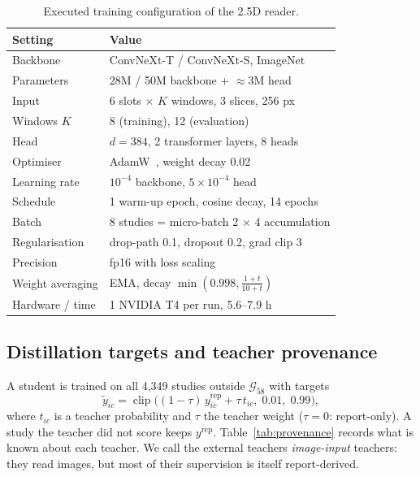 \documentclass{ieeeaccess}
\newcommand{\gold}{$\mathcal{G}_{58}$}
\begin{document}
\begin{table}[!t]
\centering
\caption{Executed training configuration of the 2.5D reader.}
\label{tab:hparams}
\setlength{\tabcolsep}{4pt}
\begin{tabular}{ll}
\toprule
Setting & Value\\
\midrule
Backbone & ConvNeXt-T / ConvNeXt-S, ImageNet\\
Parameters & 28M / 50M backbone + $\approx$3M head\\
Input & 6 slots $\times$ $K$ windows, 3 slices, 256 px\\
Windows $K$ & 8 (training), 12 (evaluation)\\
Head & $d=384$, 2 transformer layers, 8 heads\\
Optimiser & AdamW~\cite{loshchilov2019adamw}, weight decay 0.02\\
Learning rate & $10^{-4}$ backbone, $5\times10^{-4}$ head\\
Schedule & 1 warm-up epoch, cosine decay, 14 epochs\\
Batch & 8 studies = micro-batch 2 $\times$ 4 accumulation\\
Regularisation & drop-path 0.1, dropout 0.2, grad clip 3\\
Precision & fp16 with loss scaling\\
Weight averaging & EMA, decay $\min(0.998,\frac{1+t}{10+t})$\\
Hardware / time & 1 NVIDIA T4 per run, 5.6--7.9 h\\
\bottomrule
\end{tabular}
\end{table}

\subsection{Distillation targets and teacher provenance}
\label{sec:method-distill}
A student is trained on all 4,349 studies outside \gold{} with targets
\begin{equation}
\tilde{y}_{ic}=\operatorname{clip}\big((1-\tau)\,y^{\mathrm{rep}}_{ic}+\tau\,t_{ic},\;0.01,\;0.99\big),
\label{eq:mix}
\end{equation}
where $t_{ic}$ is a teacher probability and $\tau$ the teacher weight ($\tau=0$: report-only). A study the teacher did not
score keeps $y^{\mathrm{rep}}$. Table~\ref{tab:provenance} records what is known about each teacher. We call the external
teachers \emph{image-input} teachers: they read images, but most of their supervision is itself report-derived.
\end{document}
